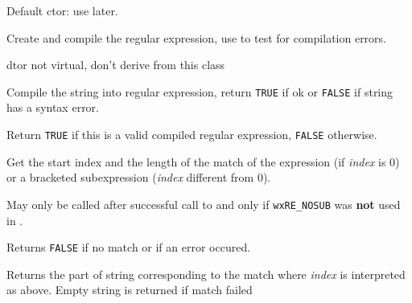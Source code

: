 
\label{wxregexwxregex}


Default ctor: use  later.

\label{wxregexwxregex}


Create and compile the regular expression, use 
 to test for compilation errors.

\label{wxregexdtor}


dtor not virtual, don't derive from this class

\label{wxregexcompile}


Compile the string into regular expression, return {\tt TRUE} if ok or {\tt FALSE} 
if string has a syntax error.

\label{wxregexisvalid}


Return {\tt TRUE} if this is a valid compiled regular expression, {\tt FALSE} 
otherwise.

\label{wxregexgetmatch}


Get the start index and the length of the match of the expression
(if {\it index} is $0$) or a bracketed subexpression ({\it index} different
from $0$).

May only be called after successful call to  
and only if {\tt wxRE\_NOSUB} was {\bf not} used in 
.

Returns {\tt FALSE} if no match or if an error occured.


Returns the part of string corresponding to the match where {\it index} is
interpreted as above. Empty string is returned if match failed

